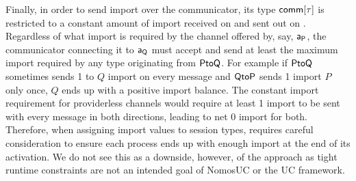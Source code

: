 Finally, in order to send import over the communicator, its type ${\mathsf {comm[\tau]}}$ is restricted to a constant amount of import received on  and sent out on .
Regardless of what import is required by the channel offered by, say, $\mathsf{a_P}$, the communicator  connecting it to $\mathsf{a_Q}$ must accept and send at least the maximum import required by any type originating from $\mathsf{PtoQ}$.
For example if $\mathsf{PtoQ}$ sometimes sends 1 to $Q$ import on every message and $\mathsf{QtoP}$ sends 1 import $P$ only once, $Q$ ends up with a positive import balance.
The constant import requirement for providerless channels would require at least 1 import to be sent with every message in both directions, leading to net 0 import for both. 
Therefore, when assigning import values to session types, requires careful consideration to ensure each process ends up with enough import at the end of its activation. 
We do not see this as a downside, however, of the approach as tight runtime constraints are not an intended goal of NomosUC or the UC framework. 
